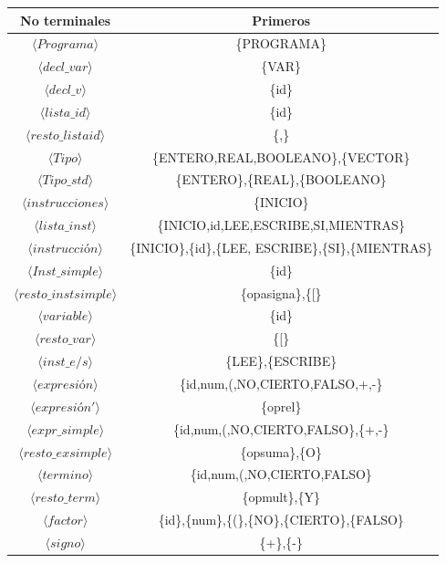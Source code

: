\documentclass[11pt]{article}
\newcommand{\nt}[1]{\langle#1\rangle}
\begin{document}
\begin{tabular}{|c|c|}
	\hline
	\textbf{No terminales} & \textbf{Primeros} \\ \hline
	$\nt{Programa}$ & \{PROGRAMA\} \\ \hline
	$\nt{decl\_var}$ & \{VAR\} \\ \hline
	$\nt{decl\_v}$ & \{id\} \\ \hline
	$\nt{lista\_id}$ & \{id\} \\ \hline
	$\nt{resto\_listaid}$ & \{,\} \\ \hline
	$\nt{Tipo}$ & \{ENTERO,REAL,BOOLEANO\},\{VECTOR\} \\ \hline
	$\nt{Tipo\_std}$ & \{ENTERO\},\{REAL\},\{BOOLEANO\} \\ \hline
	$\nt{instrucciones}$ & \{INICIO\} \\ \hline
	$\nt{lista\_inst}$ & \{INICIO,id,LEE,ESCRIBE,SI,MIENTRAS\} \\ \hline
	$\nt{instrucción}$ & \{INICIO\},\{id\},\{LEE, ESCRIBE\},\{SI\},\{MIENTRAS\} \\ \hline
	$\nt{Inst\_simple}$ & \{id\} \\ \hline
	$\nt{resto\_instsimple}$ & \{opasigna\},\{[\} \\ \hline
	$\nt{variable}$ & \{id\} \\ \hline
	$\nt{resto\_var}$ & \{[\} \\ \hline
	$\nt{inst\_e/s }$& \{LEE\},\{ESCRIBE\} \\ \hline
	$\nt{expresión}$ & \{id,num,(,NO,CIERTO,FALSO,+,-\} \\ \hline
	$\nt{expresión'}$ & \{oprel\} \\ \hline
	$\nt{expr\_simple}$ & \{id,num,(,NO,CIERTO,FALSO\},\{+,-\} \\ \hline
	$\nt{resto\_exsimple}$ & \{opsuma\},\{O\} \\ \hline
	$\nt{termino}$ & \{id,num,(,NO,CIERTO,FALSO\} \\ \hline
	$\nt{resto\_term}$ & \{opmult\},\{Y\} \\ \hline
	$\nt{factor}$ & \{id\},\{num\},\{(\},\{NO\},\{CIERTO\},\{FALSO\} \\ \hline
	$\nt{signo}$ & \{+\},\{-\} \\ \hline
\end{tabular}
\end{document}
